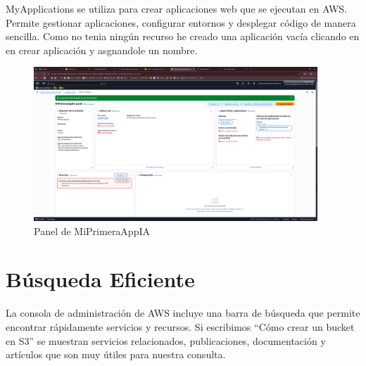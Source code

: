 \documentclass{article}
\begin{document}
	MyApplications se utiliza para crear aplicaciones web que se ejecutan en AWS. Permite gestionar aplicaciones, configurar entornos y desplegar código de manera sencilla. Como no tenia ningún recurso he creado una aplicación vacía clicando en en crear aplicación y asgnandole un nombre.

	\begin{figure}[h!]
	\centering
	\includegraphics[width=0.95\textwidth]{tarea_4.png}
	\caption{Panel de MiPrimeraAppIA}
	\end{figure}

	\newpage

	\section{Búsqueda Eficiente}

	La consola de administración de AWS incluye una barra de búsqueda que permite encontrar rápidamente servicios y recursos. Si escribimos ``Cómo crear un bucket en S3'' se muestran servicios relacionados, publicaciones, documentación y artículos que son muy útiles para nuestra consulta.
\end{document}
